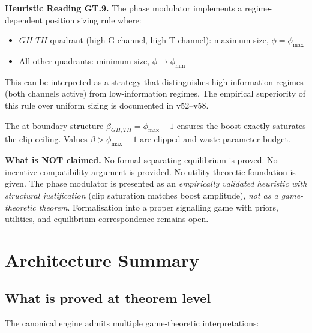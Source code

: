 \documentclass[11pt,a4paper]{article}
\theoremstyle{definition}
\begin{document}
\textbf{Heuristic Reading GT.9.}
The phase modulator implements a regime-dependent position sizing rule where:
\begin{itemize}
\item $GH$-$TH$ quadrant (high G-channel, high T-channel): maximum size, $\phi = \phi_\mathrm{max}$
\item All other quadrants: minimum size, $\phi \to \phi_\mathrm{min}$
\end{itemize}

This can be interpreted as a strategy that distinguishes high-information regimes (both channels active)
from low-information regimes. The empirical superiority of this rule over uniform sizing is documented in v52--v58.

The at-boundary structure $\beta_{GH,TH} = \phi_\mathrm{max} - 1$ ensures the boost exactly saturates the clip ceiling.
Values $\beta > \phi_\mathrm{max} - 1$ are clipped and waste parameter budget.

\textbf{What is NOT claimed.}
No formal separating equilibrium is proved.
No incentive-compatibility argument is provided.
No utility-theoretic foundation is given.
The phase modulator is presented as an \emph{empirically validated heuristic with structural justification}
(clip saturation matches boost amplitude), \emph{not as a game-theoretic theorem}.
Formalisation into a proper signalling game with priors, utilities, and equilibrium correspondence remains open.

\section{Architecture Summary}

\subsection{What is proved at theorem level}

The canonical engine admits multiple game-theoretic interpretations:
\end{document}
